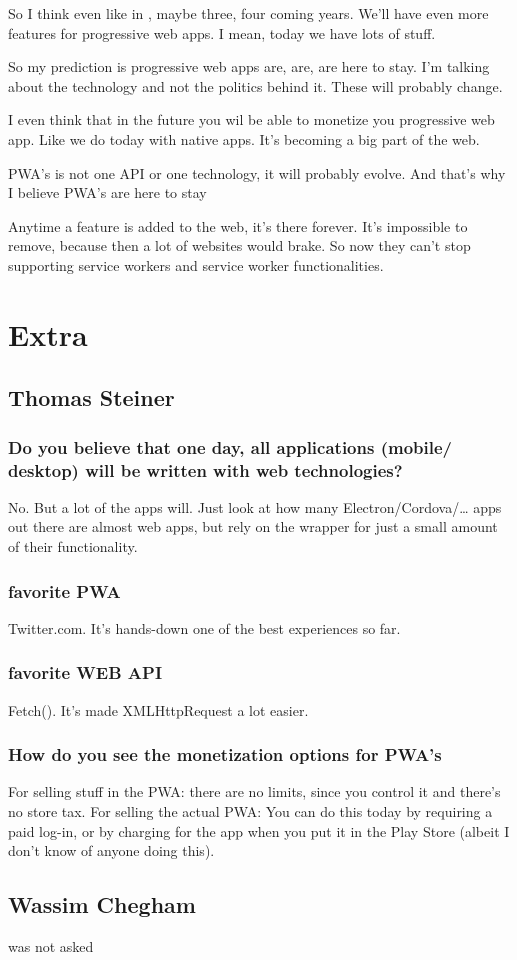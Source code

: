 			So I think even like in , maybe three, four coming years. We'll have even more features for progressive web apps. I mean, today we have lots of stuff. 
			
			So  my prediction is progressive web apps are, are, are here to stay. I'm talking about the technology and not the politics behind it. These will probably change.
			
			I even think that in the future you wil be able to monetize you progressive web app. Like we do today with native apps. It's becoming a big part of the web.
			
			PWA's is not one API or one technology, it will probably evolve. And that's why I believe PWA's are here to stay
			
			Anytime a feature is added to the web, it's there forever. It's impossible to remove, because then a lot of websites would brake. So now they can't stop supporting service workers and service worker functionalities.
			
			
	\section{Extra}
			
		\subsection{Thomas Steiner}
			\subsubsection{Do you believe that one day, all applications (mobile/ desktop) will be written with web 
			technologies? }
				No. But a lot of the apps will. Just look at how many Electron/Cordova/… apps out there are almost web apps, but rely on the wrapper for just a small amount of their functionality.
			\subsubsection{favorite PWA}
				Twitter.com. It’s hands-down one of the best experiences so far.
			
			\subsubsection{favorite WEB API}
				Fetch(). It’s made XMLHttpRequest a lot easier.
			
			\subsubsection{How do you see the monetization options for PWA's}
				For selling stuff in the PWA: there are no limits, since you control it and there’s no store tax. For selling the actual PWA: You can do this today by requiring a paid log-in, or by charging for the app when you put it in the Play Store (albeit I don’t know of anyone doing this). 
		
		\subsection{Wassim Chegham}
			was not asked			

